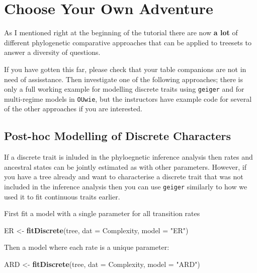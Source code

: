 \documentclass[]{article}
\newenvironment{Shaded}{\begin{snugshade}}{\end{snugshade}}
\newcommand{\KeywordTok}[1]{\textcolor[rgb]{0.13,0.29,0.53}{\textbf{#1}}}
\newcommand{\DataTypeTok}[1]{\textcolor[rgb]{0.13,0.29,0.53}{#1}}
\newcommand{\StringTok}[1]{\textcolor[rgb]{0.31,0.60,0.02}{#1}}
\newcommand{\NormalTok}[1]{#1}
\begin{document}
\section{Choose Your Own Adventure}\label{choose-your-own-adventure}

As I mentioned right at the beginning of the tutorial there are now
\textbf{a lot} of different phylogenetic comparative approaches that can
be applied to treesets to answer a diversity of questions.

If you have gotten this far, please check that your table companions are
not in need of assisstance. Then investigate one of the following
approaches; there is only a full working example for modelling discrete
traits using \texttt{geiger} and for multi-regime models in
\texttt{OUwie}, but the instructors have example code for several of the
other approaches if you are interested.

\subsection{Post-hoc Modelling of Discrete
Characters}\label{post-hoc-modelling-of-discrete-characters}

If a discrete trait is inluded in the phyloegnetic inference analysis
then rates and ancestral states can be jointly estimated as with other
parameters. However, if you have a tree already and want to characterise
a discrete trait that was not included in the inference analysis then
you can use \texttt{geiger} similarly to how we used it to fit
continuous traits earlier.

First fit a model with a single parameter for all transition rates

\begin{Shaded}
\begin{Highlighting}[]
\NormalTok{ER <-}\StringTok{ }\KeywordTok{fitDiscrete}\NormalTok{(tree, }\DataTypeTok{dat =}\NormalTok{ Complexity, }\DataTypeTok{model =} \StringTok{"ER"}\NormalTok{)}
\end{Highlighting}
\end{Shaded}

Then a model where each rate is a unique parameter:

\begin{Shaded}
\begin{Highlighting}[]
\NormalTok{ARD <-}\StringTok{ }\KeywordTok{fitDiscrete}\NormalTok{(tree, }\DataTypeTok{dat =}\NormalTok{ Complexity, }\DataTypeTok{model =} \StringTok{"ARD"}\NormalTok{)}
\end{Highlighting}
\end{Shaded}
\end{document}
